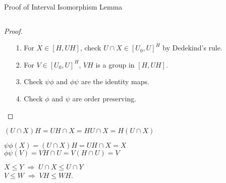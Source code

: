 \begin{frame}[fragile,label=ProofOfIntervalIsomorphism,shrink=5]{Proof of Interval Isomorphism Lemma}
\begin{columns}
\begin{column}{0.55\textwidth}
    \end{column}
  \end{columns}
\vskip5mm
      \begin{proof}
        \begin{itemize}
        \item[1.] For $X\in [H, UH]$,
          check $U\cap X \in [U_0, U]^H$ by Dedekind's rule.\vskip6pt
        \item[2.] For $V\in [U_0, U]^H$, $VH$ is a group in $[H, UH]$.\vskip6pt
        \item[3.]  Check $\psi \phi$ and $\phi \psi$ are the identity maps. \vskip6pt
        \item[4.] Check $\phi$ and $\psi$ are order preserving.
        \end{itemize}
      \end{proof}

\end{frame}

\begin{frame}[fragile,label=ComputationsForProofOfIntervalIsomorphism,shrink=5]{}
 $(U\cap X) H = UH \cap X= HU \cap X = H(U \cap X)$
\end{frame}
\begin{frame}[fragile,label=ComputationsForProofOfIntervalIsomorphism,shrink=5]{}
  $\psi \phi (X) = (U\cap X)H =UH \cap X = X$\\[4pt]
  $\phi \psi(V)= VH \cap U =V(H\cap U)= V$
\end{frame}
\begin{frame}[fragile,label=ComputationsForProofOfIntervalIsomorphism,shrink=5]{}
$X\leq Y \; \Rightarrow \; U\cap X \leq U\cap Y$\\[4pt]
  $V\leq W \; \Rightarrow \; VH \leq WH$.
\end{frame}


